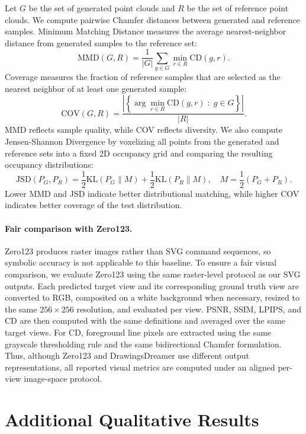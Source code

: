 \documentclass{article}
\begin{document}
Let $G$ be the set of generated point clouds and $R$ be the set of reference point clouds. We compute pairwise Chamfer distances between generated and reference samples. Minimum Matching Distance measures the average nearest-neighbor distance from generated samples to the reference set:
\begin{equation}
\mathrm{MMD}(G,R) =
\frac{1}{|G|}\sum_{g\in G}\min_{r\in R}\mathrm{CD}(g,r).
\end{equation}
Coverage measures the fraction of reference samples that are selected as the nearest neighbor of at least one generated sample:
\begin{equation}
\mathrm{COV}(G,R) =
\frac{\left|\left\{\arg\min_{r\in R}\mathrm{CD}(g,r)\;:\;g\in G\right\}\right|}{|R|}.
\end{equation}
MMD reflects sample quality, while COV reflects diversity. We also compute Jensen-Shannon Divergence by voxelizing all points from the generated and reference sets into a fixed 2D occupancy grid and comparing the resulting occupancy distributions:
\begin{equation}
\mathrm{JSD}(P_G,P_R)
= \frac{1}{2}\mathrm{KL}(P_G\|M)
+ \frac{1}{2}\mathrm{KL}(P_R\|M),
\quad
M = \frac{1}{2}(P_G+P_R).
\end{equation}
Lower MMD and JSD indicate better distributional matching, while higher COV indicates better coverage of the test distribution.

\paragraph{Fair comparison with Zero123.}
Zero123 produces raster images rather than SVG command sequences, so symbolic accuracy is not applicable to this baseline. To ensure a fair visual comparison, we evaluate Zero123 using the same raster-level protocol as our SVG outputs. Each predicted target view and its corresponding ground truth view are converted to RGB, composited on a white background when necessary, resized to the same $256 \times 256$ resolution, and evaluated per view. PSNR, SSIM, LPIPS, and CD are then computed with the same definitions and averaged over the same target views. For CD, foreground line pixels are extracted using the same grayscale thresholding rule and the same bidirectional Chamfer formulation. Thus, although Zero123 and DrawingsDreamer use different output representations, all reported visual metrics are computed under an aligned per-view image-space protocol.


\section{Additional Qualitative Results}
\label{sec: add}
\end{document}
